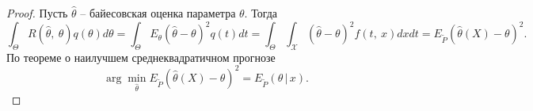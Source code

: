 \begin{proof}
    Пусть $\displaystyle \hat{\theta }$ -- байесовская оценка параметра $\displaystyle \theta $. Тогда
    \begin{equation*}
        \int _{\Theta } R(\hat{\theta } ,\ \theta) q( \theta ) d\theta =\int _{\Theta } E_{\theta }(\hat{\theta } -\theta )^{2} q( t) dt=\int _{\Theta }\int _{\mathcal{X}}(\hat{\theta } -\theta )^{2} f( t,\ x) dxdt=E_{\tilde{P}}(\hat{\theta }( X) -\theta )^{2} .
    \end{equation*}
    По теореме о наилучшем среднеквадратичном прогнозе
    \begin{equation*}
        \arg\min_{\hat{\theta}}E_{\tilde{P}}(\hat{\theta }( X) -\theta )^{2} = E_{\tilde{P}}(\theta\, \vert\, x).
    \end{equation*}
\end{proof}